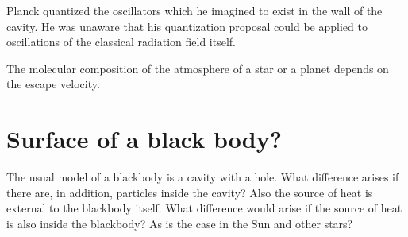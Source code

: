 \documentclass{../template/texnote}
\begin{document}
Planck quantized the oscillators which he imagined to exist in the wall of the
cavity. He was unaware that his quantization proposal could be applied to 
oscillations of the classical radiation field itself.

The molecular composition of the atmosphere of a star or a planet depends on
the escape velocity.

\section*{Surface of a black body?}
The usual model of a blackbody is a cavity with a hole.
What difference arises if there are, in addition, particles inside the cavity?
Also the source of heat is external to the blackbody itself.
What difference would arise if the source of heat is also inside the blackbody?
As is the case in the Sun and other stars?

    \printbibliography
\end{document}
